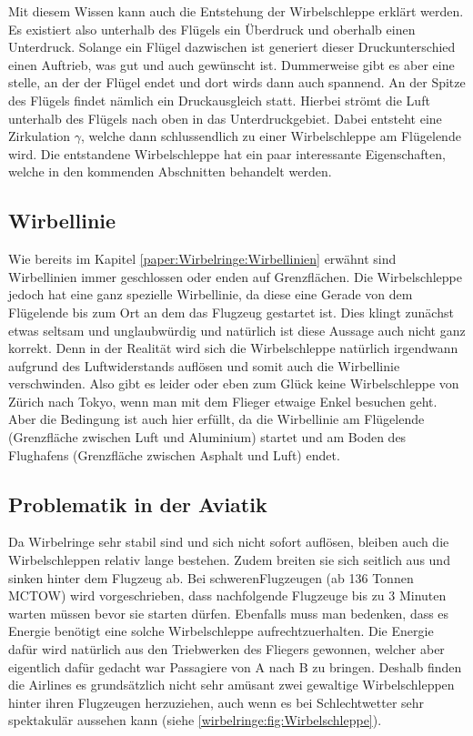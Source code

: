 Mit diesem Wissen kann auch die Entstehung der Wirbelschleppe erklärt werden. 
Es existiert also unterhalb des Flügels ein Überdruck und oberhalb einen Unterdruck.
Solange ein Flügel dazwischen ist generiert dieser Druckunterschied einen Auftrieb, was gut und auch gewünscht ist.
Dummerweise gibt es aber eine stelle, an der der Flügel endet und dort wirds dann auch spannend.
An der Spitze des Flügels findet nämlich ein Druckausgleich statt.
Hierbei strömt die Luft unterhalb des Flügels nach oben in das Unterdruckgebiet. 
Dabei entsteht eine Zirkulation $\gamma$, welche dann schlussendlich zu einer Wirbelschleppe am Flügelende wird.
Die entstandene Wirbelschleppe hat ein paar interessante Eigenschaften, welche in den kommenden Abschnitten behandelt werden.

\subsection{Wirbellinie}
Wie bereits im Kapitel \ref{paper:Wirbelringe:Wirbellinien} erwähnt sind Wirbellinien immer geschlossen oder enden auf Grenzflächen.
Die Wirbelschleppe jedoch hat eine ganz spezielle Wirbellinie, da diese eine Gerade von dem Flügelende bis zum Ort an dem das Flugzeug gestartet ist.
Dies klingt zunächst etwas seltsam und unglaubwürdig und natürlich ist diese Aussage auch nicht ganz korrekt.
Denn in der Realität wird sich die Wirbelschleppe natürlich irgendwann aufgrund des Luftwiderstands auflösen und somit auch die Wirbellinie verschwinden.
Also gibt es leider oder eben zum Glück keine Wirbelschleppe von Zürich nach Tokyo, wenn man mit dem Flieger etwaige Enkel besuchen geht.
Aber die Bedingung ist auch hier erfüllt, da die Wirbellinie am Flügelende (Grenzfläche zwischen Luft und Aluminium) startet und am Boden des Flughafens (Grenzfläche zwischen Asphalt und Luft) endet.

\subsection{Problematik in der Aviatik}
Da Wirbelringe sehr stabil sind und sich nicht sofort auflösen, bleiben auch die Wirbelschleppen relativ lange bestehen.
Zudem breiten sie sich seitlich aus und sinken hinter dem Flugzeug ab.
Bei \glqq schweren\grqq Flugzeugen (ab 136 Tonnen MCTOW)\cite{Wirbelringe:WakeTurbulence} wird vorgeschrieben, dass nachfolgende Flugzeuge bis zu 3 Minuten warten müssen bevor sie starten dürfen.
Ebenfalls muss man bedenken, dass es Energie benötigt eine solche Wirbelschleppe aufrechtzuerhalten.
Die Energie dafür wird natürlich aus den Triebwerken des Fliegers gewonnen, welcher aber eigentlich dafür gedacht war Passagiere von A nach B zu bringen.
Deshalb finden die Airlines es grundsätzlich nicht sehr amüsant zwei gewaltige Wirbelschleppen hinter ihren Flugzeugen herzuziehen, auch wenn es bei Schlechtwetter sehr spektakulär aussehen kann (siehe \ref{wirbelringe:fig:Wirbelschleppe}).